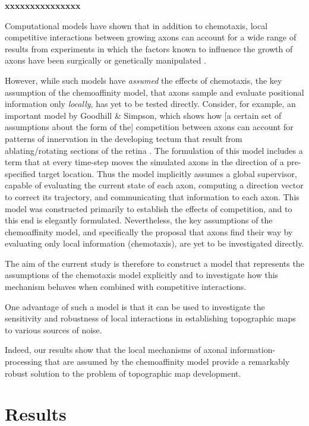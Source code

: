 \documentclass[11pt, a4paper]{article}
\begin{document}
\textbf{xxxxxxxxxxxxxxx}

Computational models have shown that in addition to chemotaxis, local competitive interactions between growing axons can account for a wide range of results from experiments in which the factors known to influence the growth of axons have been surgically or genetically manipulated \citep{prestige_role_1975,simpson_simple_2011,suetterlin_target-independent_2014}.

However, while such models have \emph{assumed} the effects of chemotaxis, the key assumption of the chemoaffinity model, that axons sample and evaluate positional information only \emph{locally}, has yet to be tested directly.
%
Consider, for example, an important model by Goodhill \& Simpson, which shows how [a certain set of assumptions about the form of the] competition between axons can account for patterns of innervation in the developing tectum that result from ablating/rotating sections of the retina \citep{simpson_simple_2011}. 
%   
The formulation of this model includes a term that at every time-step moves the simulated axons in the direction of a pre-specified target location. 
Thus the model implicitly assumes a global supervisor, capable of evaluating the current state of each axon, computing a direction vector to correct its trajectory, and communicating that information to each axon.
%   
This model was constructed primarily to establish the effects of competition, and to this end is elegantly formulated.
%
Nevertheless, the key assumptions of the chemoaffinity model, and specifically the proposal that axons find their way by evaluating only local information (chemotaxis), are yet to be investigated directly.

The aim of the current study is therefore to construct a model that represents the assumptions of the chemotaxis model explicitly and to investigate how this mechanism behaves when combined with competitive interactions.
    
One advantage of such a model is that it can be used to investigate the sensitivity and robustness of local interactions in establishing topographic maps to various sources of noise.
    
Indeed, our results show that the local mechanisms of axonal information-processing that are assumed by the chemoaffinity model provide a remarkably robust solution to the problem of topographic map development.

\section{Results}
\end{document}
